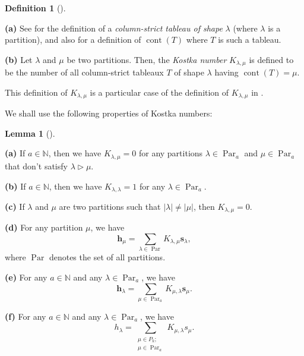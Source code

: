 \documentclass[numbers=enddot,12pt,final,onecolumn,notitlepage]{scrartcl}%
\theoremstyle{definition}
\newtheorem{lem}[theo]{Lemma}
\newenvironment{lemma}[1][]
{\begin{lem}[#1]\begin{leftbar}}
{\end{leftbar}\end{lem}}
\newtheorem{defi}[theo]{Definition}
\newenvironment{definition}[1][]
{\begin{defi}[#1]\begin{leftbar}}
{\end{leftbar}\end{defi}}
\let\sumnonlimits\sum
\renewcommand{\sum}{\sumnonlimits\limits}
\begin{document}
\begin{definition}
\textbf{(a)} See \cite[\S 2.2]{GriRei18} for the definition of a
\textit{column-strict tableau of shape }$\lambda$ (where $\lambda$ is a
partition), and also for a definition of $\operatorname*{cont}\left(
T\right)  $ where $T$ is such a tableau.

\textbf{(b)} Let $\lambda$ and $\mu$ be two partitions. Then, the
\textit{Kostka number }$K_{\lambda,\mu}$ is defined to be the number of all
column-strict tableaux $T$ of shape $\lambda$ having $\operatorname*{cont}%
\left(  T\right)  =\mu$.
\end{definition}

This definition of $K_{\lambda,\mu}$ is a particular case of the definition of
$K_{\lambda,\mu}$ in \cite[Exercise 2.2.13]{GriRei18}.

We shall use the following properties of Kostka numbers:

\begin{lemma}
\label{lem.kostka.facts}\textbf{(a)} If $a\in\mathbb{N}$, then we have
$K_{\lambda,\mu}=0$ for any partitions $\lambda\in\operatorname*{Par}%
\nolimits_{a}$ and $\mu\in\operatorname*{Par}\nolimits_{a}$ that don't satisfy
$\lambda\triangleright\mu$.

\textbf{(b)} If $a\in\mathbb{N}$, then we have $K_{\lambda,\lambda}=1$ for any
$\lambda\in\operatorname*{Par}\nolimits_{a}$.

\textbf{(c)} If $\lambda$ and $\mu$ are two partitions such that $\left\vert
\lambda\right\vert \neq\left\vert \mu\right\vert $, then $K_{\lambda,\mu}=0$.

\textbf{(d)} For any partition $\mu$, we have%
\[
\mathbf{h}_{\mu}=\sum_{\lambda\in\operatorname*{Par}}K_{\lambda,\mu}%
\mathbf{s}_{\lambda},
\]
where $\operatorname*{Par}$ denotes the set of all partitions.

\textbf{(e)} For any $a\in\mathbb{N}$ and any $\lambda\in\operatorname*{Par}%
\nolimits_{a}$, we have%
\[
\mathbf{h}_{\lambda}=\sum_{\mu\in\operatorname*{Par}\nolimits_{a}}%
K_{\mu,\lambda}\mathbf{s}_{\mu}.
\]


\textbf{(f)} For any $a\in\mathbb{N}$ and any $\lambda\in\operatorname*{Par}%
\nolimits_{a}$, we have%
\[
h_{\lambda}=\sum_{\substack{\mu\in P_{k};\\\mu\in\operatorname*{Par}%
\nolimits_{a}}}K_{\mu,\lambda}s_{\mu}.
\]

\end{lemma}
\end{document}
